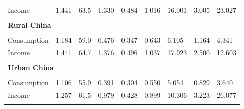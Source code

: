 \begin{tabular}{l p{1.4cm} p{1.4cm} p{1.4cm} p{1.4cm} p{1.4cm} p{1.4cm} p{1.4cm} p{1.4cm}}
Income      & 1.441    & 63.5          & 1.330         & 0.484    &   1.016                    &   16.001        &    3.005       &  23.027         \\
\\
\multicolumn{9}{l}{\textbf{Rural China}} \\
\midrule \\
Consumption & 1.184   & 59.0         & 0.476        & 0.347    &   0.643                  &   6.105       &    1.164      &  4.341        \\
Income      & 1.441  & 64.7        & 1.376       & 0.496   &   1.037                 &   17.923      &    2.500     &  12.603       \\
\\
\multicolumn{9}{l}{\textbf{Urban China}} \\
\midrule \\
Consumption & 1.106   & 55.9         & 0.391        & 0.304    &   0.550                  &   5.054       &    0.829      &  3.640        \\
Income      & 1.257  & 61.5        & 0.979       & 0.428   &   0.899                 &   10.306      &    3.223     &  26.077       \\
\\
\bottomrule
\end{tabular}